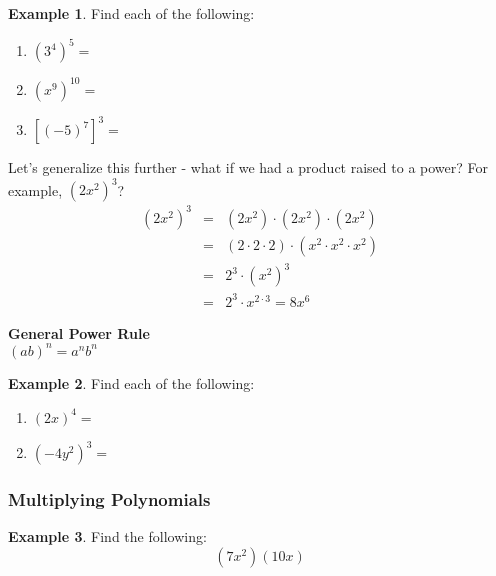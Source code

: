 \documentclass[addpoints,12pt]{exam}
\theoremstyle{definition}
\theoremstyle{break}
\theoremstyle{break}
\newtheorem{example}{Example}[subsection]
\begin{document}
\newpage
\begin{example}
Find each of the following:
\begin{enumerate}
\item $(3^4)^5 = $
\vspace{.25in}
\item $(x^9)^{10} = $
\vspace{.25in}
\item $[(-5)^7]^3 = $
\vspace{.25in}
\end{enumerate}
\end{example}
\vspace{.25in}

\noindent Let's generalize this further - what if we had a product raised to a power? For example, $(2x^2)^3$?
\begin{eqnarray*}
(2x^2)^3 &=& (2x^2)\cdot(2x^2)\cdot(2x^2)\\
&=& (2\cdot 2\cdot 2)\cdot (x^2\cdot x^2\cdot x^2)\\
&=& 2^3 \cdot (x^2)^3\\
&=& 2^3\cdot x^{2\cdot 3} = 8x^6
\end{eqnarray*}

\vspace{.15in}

\begin{mdframed}
\textbf{General Power Rule}\mbox{}\\
$(ab)^n = a^nb^n$
\end{mdframed}

\vspace{.15in}

\begin{example}
Find each of the following:
\begin{enumerate}
\item $(2x)^4 = $
\vspace{.5in}
\item $(-4y^2)^3 = $
\end{enumerate}
\end{example}


\newpage

\subsubsection*{Multiplying Polynomials}
\vspace{.15in}
\begin{example}
Find the following:
\[(7x^2)(10x)\]
\vspace{.5in}
\end{example}
\end{document}
